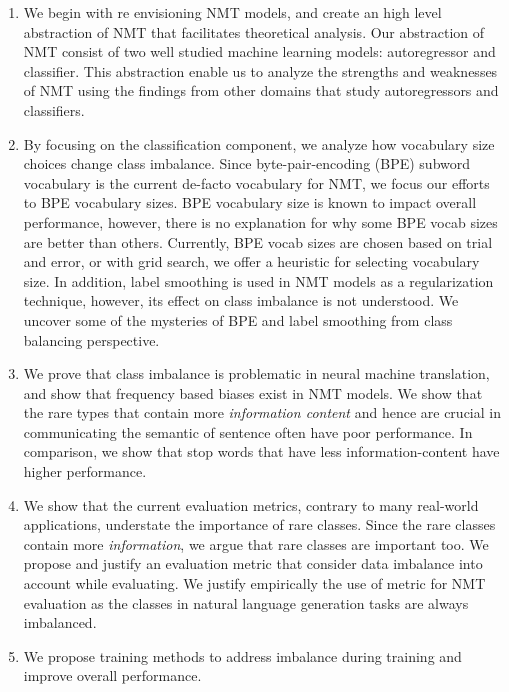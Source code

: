 \begin{enumerate}

\item We begin with re envisioning NMT models, and create an high level abstraction of NMT that facilitates theoretical analysis. 
Our abstraction of NMT consist of two well studied machine learning models: autoregressor and classifier.
This abstraction enable us to analyze the strengths and weaknesses of NMT using the findings from other domains that study autoregressors and classifiers.

\item By focusing on the classification component, we analyze how vocabulary size choices change class imbalance. Since byte-pair-encoding (BPE) subword vocabulary is the current de-facto vocabulary for NMT, we focus our efforts to BPE vocabulary sizes.
BPE vocabulary size is known to impact overall performance, however, there is no explanation for why some BPE vocab sizes are better than others. 
Currently, BPE vocab sizes are chosen based on trial and error, or with grid search, we offer a heuristic for selecting vocabulary size. 
In addition, label smoothing is used in NMT models as a regularization technique, however, its effect on class imbalance is not understood. We uncover some of the mysteries of BPE and label smoothing from class balancing perspective.

\item We prove that class imbalance is problematic in neural machine translation, and show that frequency based biases exist in NMT models.
We show that the rare types that contain more \textit{information content} and hence are crucial in communicating the semantic of sentence often have poor performance. In comparison, we show that stop words that have less information-content have higher performance. 

\item We show that the current evaluation metrics, contrary to many real-world applications, understate the importance of rare classes. 
Since the rare classes contain more \textit{information}, we argue that rare classes are important too.
We propose and justify an evaluation metric that consider data imbalance into account while evaluating.
We justify empirically the use of  metric for NMT evaluation as the classes in natural language generation tasks are always imbalanced. 

\item We propose training methods to address imbalance during training and improve overall performance.

\end{enumerate}
